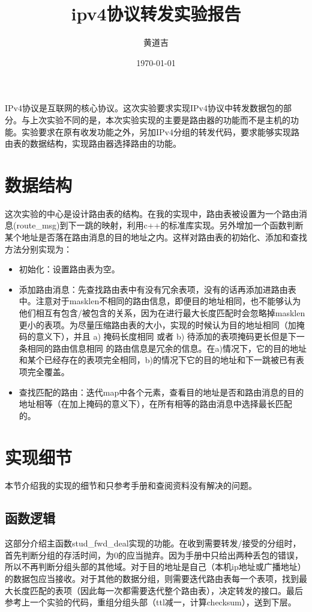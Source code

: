 \documentclass{article}
\author{黄道吉}
\title{ipv4协议转发实验报告}
\date{\today}
\begin{document}
\maketitle

IPv4协议是互联网的核心协议。这次实验要求实现IPv4协议中转发数据包的部分。与上次实验不同的是，本次实验实现的主要是路由器的功能而不是主机的功能。实验要求在原有收发功能之外，另加IPv4分组的转发代码，要求能够实现路由表的数据结构，实现路由器选择路由的功能。

\section{数据结构}

这次实验的中心是设计路由表的结构。在我的实现中，路由表被设置为一个路由消息(route\_msg)到下一跳的映射，利用c++的标准库实现。另外增加一个函数判断某个地址是否落在路由消息的目的地址之内。这样对路由表的初始化、添加和查找方法分别实现为：
\begin{itemize}
    \item 初始化：设置路由表为空。
    \item 添加路由消息：先查找路由表中有没有冗余表项，没有的话再添加进路由表中。注意对于masklen不相同的路由信息，即便目的地址相同，也不能够认为他们相互有包含/被包含的关系，因为在进行最大长度匹配时会忽略掉masklen更小的表项。为尽量压缩路由表的大小，实现的时候认为目的地址相同（加掩码的意义下），并且 a) 掩码长度相同 或者 b) 待添加的表项掩码更长但是下一条相同的路由信息相同 的路由信息是冗余的信息。在a)情况下，它的目的地址和某个已经存在的表项完全相同，b)的情况下它的目的地址和下一跳被已有表项完全覆盖。
    \item 查找匹配的路由：迭代map中各个元素，查看目的地址是否和路由消息的目的地址相等（在加上掩码的意义下），在所有相等的路由消息中选择最长匹配的。
\end{itemize}

\section{实现细节}

本节介绍我的实现的细节和只参考手册和查阅资料没有解决的问题。

\subsection{函数逻辑}

这部分介绍主函数stud\_fwd\_deal实现的功能。在收到需要转发/接受的分组时，首先判断分组的存活时间，为0的应当抛弃。因为手册中只给出两种丢包的错误，所以不再判断分组头部的其他域。对于目的地址是自己（本机ip地址或广播地址）的数据包应当接收。对于其他的数据分组，则需要迭代路由表每一个表项，找到最大长度匹配的表项（因此每一次都需要迭代整个路由表），决定转发的接口。最后参考上一个实验的代码，重组分组头部（ttl减一，计算checksum），送到下层。
\end{document}
